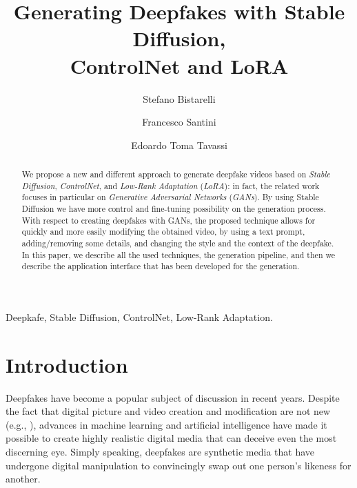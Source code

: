 \documentclass[preprint]{elsarticle}
\begin{document}
\begin{frontmatter}


\title{Generating Deepfakes with Stable Diffusion,\\ ControlNet and LoRA}





\author[perugia]{Stefano Bistarelli}
\author[perugia]{Francesco Santini}
\author[perugia]{Edoardo Toma Tavassi}


\address[perugia]{Dipartimento di Matematica e  Informatica, University of Perugia, Italy}




\begin{abstract} 
We propose a new and different approach to generate deepfake videos based on \emph{Stable Diffusion}, \emph{ControlNet}, and \emph{Low-Rank Adaptation} (\emph{LoRA}): in fact, the related work focuses in particular on \emph{Generative Adversarial Networks} (\emph{GANs}). By using Stable Diffusion we  have more control and fine-tuning possibility on the generation process. With respect to creating deepfakes with GANs, the proposed technique allows for quickly and more easily modifying the obtained video, by  using a text prompt, adding/removing some details, and changing the style  and the context of the deepfake. In this paper, we describe all the used techniques, the generation pipeline, and then we describe the application interface that has been developed for the generation.
\end{abstract}

\begin{keyword}
Deepkafe, Stable Diffusion, ControlNet, Low-Rank Adaptation.
\end{keyword}
\end{frontmatter}



\section{Introduction}\label{sec:intro}
Deepfakes have become a popular subject of discussion in recent years. 
Despite the fact that digital picture and video creation and modification are not new (e.g., \cite{farid}), advances in machine learning and artificial intelligence have made it possible to create highly realistic digital media that can deceive even the most discerning eye. Simply speaking, deepfakes are synthetic media that have undergone digital manipulation to convincingly swap out one person's likeness for another.
\end{document}
